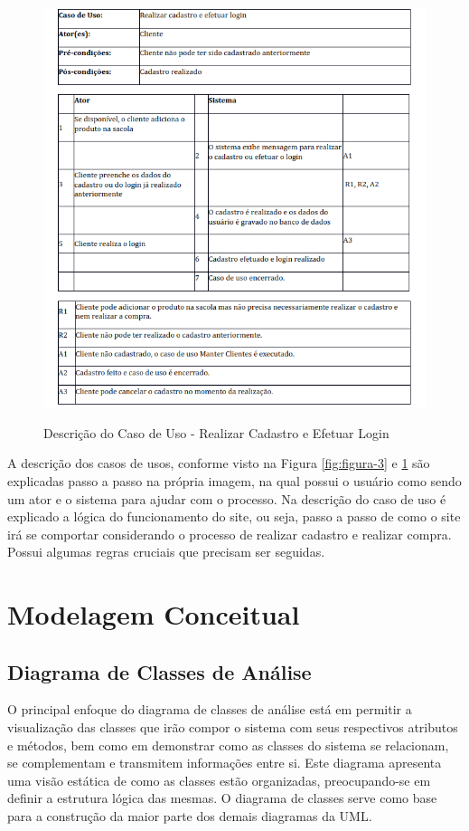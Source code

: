 \begin{figure}[H]  %
    \centering
    \caption{Descrição do Caso de Uso -  Realizar Cadastro e Efetuar Login}
    \includegraphics[width=1.0\textwidth]{./dados/figuras/2}
    \label{fig:figura-4}
\end{figure}

A descrição dos casos de usos, conforme visto na Figura \ref{fig:figura-3} e \ref{fig:figura-4} são explicadas passo a passo na própria imagem, na qual possui o usuário como sendo um ator e o sistema para ajudar com o processo. Na descrição do caso de uso é explicado a lógica do funcionamento do site, ou seja, passo a passo de como o site irá se comportar considerando o processo de realizar cadastro e realizar compra. Possui algumas regras cruciais que precisam ser seguidas.  

\section{Modelagem Conceitual}
\label{sec:modcon}

\subsection{Diagrama de Classes de Análise}
\label{sec:diacla}
O principal enfoque do diagrama de classes de análise está em permitir a visualização das classes que irão compor o sistema com seus respectivos atributos e métodos, bem como em demonstrar como as classes do sistema se relacionam, se complementam e transmitem informações entre si. Este diagrama apresenta uma visão estática de como as classes estão organizadas, preocupando-se em definir a estrutura lógica das mesmas. O diagrama de classes serve como base para a construção da maior parte dos demais diagramas da UML. \cite{class}
 
